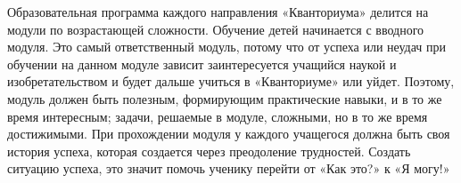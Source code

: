 
Образовательная программа каждого направления «Кванториума» делится на модули по
возрастающей сложности. Обучение детей начинается с вводного модуля. Это самый
ответственный модуль, потому что от успеха или неудач при обучении на данном
модуле зависит заинтересуется учащийся наукой и изобретательством и будет дальше
учиться в «Кванториуме» или уйдет. Поэтому, модуль должен быть полезным,
формирующим практические навыки, и в то же время интересным; задачи, решаемые в
модуле, сложными, но в то же время достижимыми. При прохождении модуля у каждого
учащегося должна быть своя история успеха, которая создается через преодоление
трудностей. Создать ситуацию успеха, это значит помочь ученику перейти от «Как
это?» к «Я могу!»
